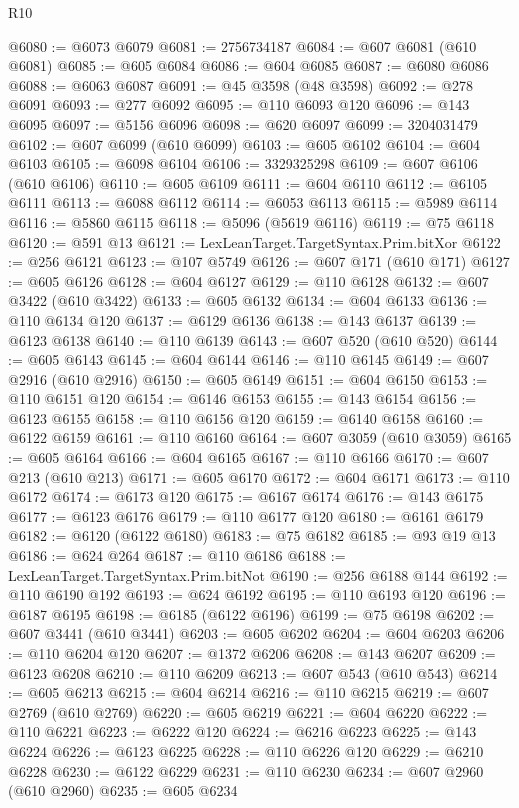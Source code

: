 \begin{lexlean}{R10}
\begin{coremodule}
@6080 := @6073 @6079
@6081 := 2756734187
@6084 := @607 @6081 (@610 @6081)
@6085 := @605 @6084
@6086 := @604 @6085
@6087 := @6080 @6086
@6088 := @6063 @6087
@6091 := @45 @3598 (@48 @3598)
@6092 := @278 @6091
@6093 := @277 @6092
@6095 := @110 @6093 @120
@6096 := @143 @6095
@6097 := @5156 @6096
@6098 := @620 @6097
@6099 := 3204031479
@6102 := @607 @6099 (@610 @6099)
@6103 := @605 @6102
@6104 := @604 @6103
@6105 := @6098 @6104
@6106 := 3329325298
@6109 := @607 @6106 (@610 @6106)
@6110 := @605 @6109
@6111 := @604 @6110
@6112 := @6105 @6111
@6113 := @6088 @6112
@6114 := @6053 @6113
@6115 := @5989 @6114
@6116 := @5860 @6115
@6118 := @5096 (@5619 @6116)
@6119 := @75 @6118
@6120 := @591 @13
@6121 := LexLeanTarget.TargetSyntax.Prim.bitXor
@6122 := @256 @6121
@6123 := @107 @5749
@6126 := @607 @171 (@610 @171)
@6127 := @605 @6126
@6128 := @604 @6127
@6129 := @110 @6128
@6132 := @607 @3422 (@610 @3422)
@6133 := @605 @6132
@6134 := @604 @6133
@6136 := @110 @6134 @120
@6137 := @6129 @6136
@6138 := @143 @6137
@6139 := @6123 @6138
@6140 := @110 @6139
@6143 := @607 @520 (@610 @520)
@6144 := @605 @6143
@6145 := @604 @6144
@6146 := @110 @6145
@6149 := @607 @2916 (@610 @2916)
@6150 := @605 @6149
@6151 := @604 @6150
@6153 := @110 @6151 @120
@6154 := @6146 @6153
@6155 := @143 @6154
@6156 := @6123 @6155
@6158 := @110 @6156 @120
@6159 := @6140 @6158
@6160 := @6122 @6159
@6161 := @110 @6160
@6164 := @607 @3059 (@610 @3059)
@6165 := @605 @6164
@6166 := @604 @6165
@6167 := @110 @6166
@6170 := @607 @213 (@610 @213)
@6171 := @605 @6170
@6172 := @604 @6171
@6173 := @110 @6172
@6174 := @6173 @120
@6175 := @6167 @6174
@6176 := @143 @6175
@6177 := @6123 @6176
@6179 := @110 @6177 @120
@6180 := @6161 @6179
@6182 := @6120 (@6122 @6180)
@6183 := @75 @6182
@6185 := @93 @19 @13
@6186 := @624 @264
@6187 := @110 @6186
@6188 := LexLeanTarget.TargetSyntax.Prim.bitNot
@6190 := @256 @6188 @144
@6192 := @110 @6190 @192
@6193 := @624 @6192
@6195 := @110 @6193 @120
@6196 := @6187 @6195
@6198 := @6185 (@6122 @6196)
@6199 := @75 @6198
@6202 := @607 @3441 (@610 @3441)
@6203 := @605 @6202
@6204 := @604 @6203
@6206 := @110 @6204 @120
@6207 := @1372 @6206
@6208 := @143 @6207
@6209 := @6123 @6208
@6210 := @110 @6209
@6213 := @607 @543 (@610 @543)
@6214 := @605 @6213
@6215 := @604 @6214
@6216 := @110 @6215
@6219 := @607 @2769 (@610 @2769)
@6220 := @605 @6219
@6221 := @604 @6220
@6222 := @110 @6221
@6223 := @6222 @120
@6224 := @6216 @6223
@6225 := @143 @6224
@6226 := @6123 @6225
@6228 := @110 @6226 @120
@6229 := @6210 @6228
@6230 := @6122 @6229
@6231 := @110 @6230
@6234 := @607 @2960 (@610 @2960)
@6235 := @605 @6234

\end{coremodule}
\end{lexlean}
